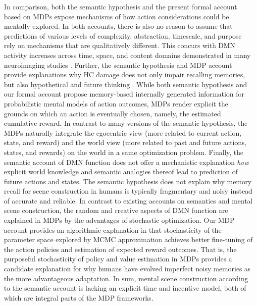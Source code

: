 \documentclass[10pt,letterpaper]{article}
\begin{document}
In comparison,
both the semantic hypothesis and the present formal account based on MDPs
expose mechanisms of how action considerations could be mentally explored.
In both accounts,
there is also no reason to assume that predictions of various
levels of complexity, abstraction, timescale, and purpose
rely on mechanisms that are qualitatively different. This concurs with
DMN activity increases across time, space, and content domains
demonstrated in many neuroimaging studies
\citep{spreng2009common, laird2009, bzdok2012morality, binder2009}.
Further, the semantic hypothesis
and MDP account provide explanations why HC damage does
not only impair recalling memories, but also hypothetical and future
thinking \citep{hassabis2007patients}.
While both semantic hypothesis and
our formal account propose memory-based internally
generated information for probabilistic mental models of action outcomes,
MDPs render explicit the grounds on which an action is
eventually chosen, namely, the estimated cumulative reward.
In contrast to many versions of the semantic hypothesis,
the MDPs naturally integrate the egocentric view
(more related to current action, state, and reward) and the
world view (more related to past and future actions, states, and rewards)
on the world in a same optimization problem.
Finally,
the semantic account of DMN function does not offer
a mechanistic explanation \textit{how}
explicit world knowledge and semantic analogies thereof
lead to prediction of future actions and states.
The semantic hypothesis does not explain why memory recall
for scene construction in humans is typically fragmentary and noisy
instead of accurate and reliable.
In contrast to existing accounts on semantics and
mental scene construction, the random and creative aspects of DMN function
are explained in MDPs by the advantages of stochastic optimization.
Our MDP account provides an algorithmic explanation in that
stochasticity of the parameter space explored
by MCMC approximation achieves better fine-tuning of the
action policies and estimation of expected reward outcomes.
That is, the purposeful stochasticity of policy and value estimation
in MDPs provides a candidate explanation for why humans
have evolved imperfect noisy memories
as the more advantageous adaptation.
In sum, mental scene construction according to the semantic
account is lacking an explicit time and incentive model,
both of which are integral parts of the MDP frameworks.
\end{document}
